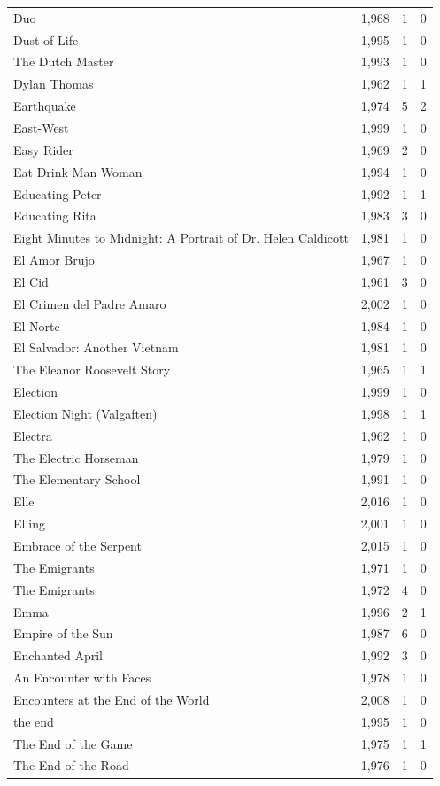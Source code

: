 \begin{tabular}{lrrr}
Duo & 1,968 & 1 & 0 \\
Dust of Life & 1,995 & 1 & 0 \\
The Dutch Master & 1,993 & 1 & 0 \\
Dylan Thomas & 1,962 & 1 & 1 \\
Earthquake & 1,974 & 5 & 2 \\
East-West & 1,999 & 1 & 0 \\
Easy Rider & 1,969 & 2 & 0 \\
Eat Drink Man Woman & 1,994 & 1 & 0 \\
Educating Peter & 1,992 & 1 & 1 \\
Educating Rita & 1,983 & 3 & 0 \\
Eight Minutes to Midnight: A Portrait of Dr. Helen Caldicott & 1,981 & 1 & 0 \\
El Amor Brujo & 1,967 & 1 & 0 \\
El Cid & 1,961 & 3 & 0 \\
El Crimen del Padre Amaro & 2,002 & 1 & 0 \\
El Norte & 1,984 & 1 & 0 \\
El Salvador: Another Vietnam & 1,981 & 1 & 0 \\
The Eleanor Roosevelt Story & 1,965 & 1 & 1 \\
Election & 1,999 & 1 & 0 \\
Election Night (Valgaften) & 1,998 & 1 & 1 \\
Electra & 1,962 & 1 & 0 \\
The Electric Horseman & 1,979 & 1 & 0 \\
The Elementary School & 1,991 & 1 & 0 \\
Elle & 2,016 & 1 & 0 \\
Elling & 2,001 & 1 & 0 \\
Embrace of the Serpent & 2,015 & 1 & 0 \\
The Emigrants & 1,971 & 1 & 0 \\
The Emigrants & 1,972 & 4 & 0 \\
Emma & 1,996 & 2 & 1 \\
Empire of the Sun & 1,987 & 6 & 0 \\
Enchanted April & 1,992 & 3 & 0 \\
An Encounter with Faces & 1,978 & 1 & 0 \\
Encounters at the End of the World & 2,008 & 1 & 0 \\
the end & 1,995 & 1 & 0 \\
The End of the Game & 1,975 & 1 & 1 \\
The End of the Road & 1,976 & 1 & 0 \\

\end{tabular}
